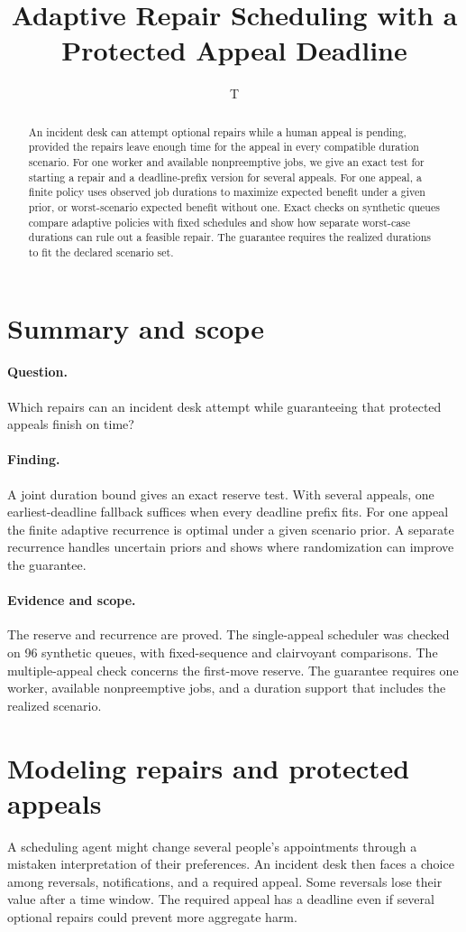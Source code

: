 \documentclass[11pt]{article}
\title{Adaptive Repair Scheduling with a Protected Appeal Deadline}
\author{T}
\date{}
\begin{document}
\maketitle
\begin{abstract}
An incident desk can attempt optional repairs while a human appeal
is pending, provided the repairs leave enough time for the appeal
in every compatible duration scenario. For one worker and available
nonpreemptive jobs, we give an exact test for starting a repair and
a deadline-prefix version for several appeals. For one appeal, a
finite policy uses observed job durations to maximize expected
benefit under a given prior, or worst-scenario expected benefit
without one. Exact checks on
synthetic queues compare adaptive policies with fixed schedules and
show how separate worst-case durations can rule out a feasible repair.
The guarantee requires the realized durations to fit the declared
scenario set.
\end{abstract}

\section*{Summary and scope}
\paragraph{Question.} Which repairs can an incident desk attempt while
guaranteeing that protected appeals finish on time?
\paragraph{Finding.} A joint duration bound gives an exact reserve
test. With several appeals, one earliest-deadline fallback suffices
when every deadline prefix fits. For one appeal the finite adaptive
recurrence is optimal under a given scenario prior. A separate
recurrence handles uncertain priors and shows where randomization
can improve the guarantee.
\paragraph{Evidence and scope.} The reserve and recurrence
are proved. The single-appeal scheduler was checked on 96 synthetic
queues, with fixed-sequence and clairvoyant comparisons. The
multiple-appeal check concerns the first-move reserve. The guarantee
requires one worker, available nonpreemptive jobs, and a duration
support that includes the realized scenario.

\section{Modeling repairs and protected appeals}
A scheduling agent might change several people’s appointments
through a mistaken interpretation of their preferences. An
incident desk then faces a choice among reversals, notifications,
and a required appeal. Some reversals lose their value after a
time window. The required appeal has a deadline even if several
optional repairs could prevent more aggregate harm.
\end{document}
